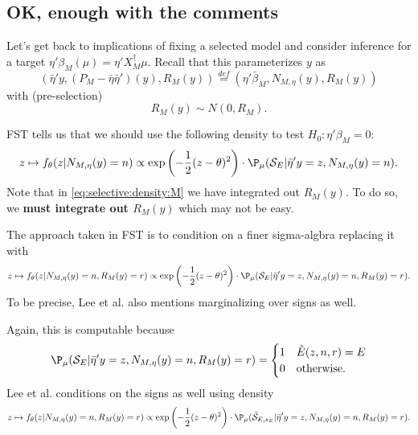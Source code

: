 \documentclass{article}
\newcommand{\OLS}{\bar{\beta}}
\begin{document}
\subsection{OK, enough with the comments}
        
Let's get back to implications of fixing a selected model and consider inference for
a target $\eta'\beta_M(\mu)=\eta'X_M^{\dagger}\mu$.
Recall that this parameterizes $y$ as
$$
\left(\bar{\eta}'y, (P_M-\bar{\eta}\bar{\eta}')(y), R_M(y)\right) \overset{def}{=}
(\eta'\OLS_M, N_{M,\eta}(y), R_M(y))
$$
with (pre-selection)
$$
R_M(y) \sim N(0, R_M).
$$

FST tells us that we should use the following density to test $H_0:\eta'\beta_M=0$:
        \begin{equation}
          \label{eq:selective:density:M}
        z \mapsto f_{\theta}(z | N_{M,\eta}(y)=n) \propto \exp \left(-\frac{1}{2}(z-\theta)^2 \right)
        \cdot \P_{\mu}({\cal S}_E | \bar{\eta}'y=z, N_{M,\eta}(y)=n).
        \end{equation}
        Note that in \eqref{eq:selective:density:M} we have integrated out $R_M(y)$. To do so,
        we {\bf must integrate out $R_M(y)$} which may not be easy.

        The approach taken in FST is to condition on a finer sigma-algbra
        replacing it with
        \begin{equation}
          \label{eq:selective:density:FST}
        z \mapsto f_{\theta}(z | N_{M,\eta}(y)=n, R_M(y)=r) \propto \exp \left(-\frac{1}{2}(z-\theta)^2 \right)
        \cdot \P_{\mu}({\cal S}_E | \bar{\eta}'y=z, N_{M,\eta}(y)=n, R_M(y)=r).
        \end{equation}
        To be precise, Lee et al. also mentions marginalizing over signs as well.
        
        Again, this is computable because
        $$
        \P_{\mu}({\cal S}_E | \bar{\eta}'y=z, N_{M,\eta}(y)=n, R_M(y)=r) =
        \begin{cases}
          1 & \hat{E}(z,n,r)=E \\
          0 & \text{otherwise.}
          \end{cases}
        $$
        Lee et al. conditions on the signs as well using density
        \begin{equation}
          \label{eq:selective:density:FST}
        z \mapsto f_{\theta}(z | N_{M,\eta}(y)=n, R_M(y)=r) \propto \exp \left(-\frac{1}{2}(z-\theta)^2 \right)
        \cdot \P_{\mu}(\bar{\cal S}_{E,s_E} | \bar{\eta}'y=z, N_{M,\eta}(y)=n, R_M(y)=r).
        \end{equation}
\end{document}
